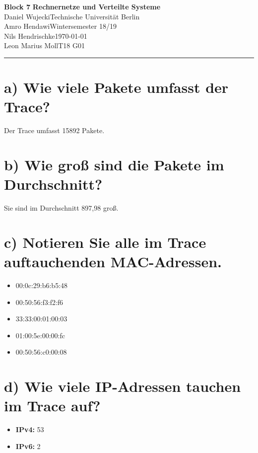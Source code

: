 \documentclass[a4paper, 11pt, fleqn, notitlepage, egregdoesnotlikesansseriftitles]{scrartcl}
\title{\aufgabe}
\subtitle{\modul}
\author{\name}
\date{\datum}
\newcommand{\aufgabe}{Block 7}
\newcommand{\modul}{Rechnernetze und Verteilte Systeme}
\newcommand{\sem}{Wintersemester 18/19}
\newcommand{\autorA}{Daniel Wujecki}
\newcommand{\autorB}{Amro Hendawi}
\newcommand{\autorC}{Nils Hendrischke}
\newcommand{\autorD}{Leon Marius Moll}
\newcommand{\uni}{Technische Universität Berlin}
\newcommand{\datum}{\today}
\begin{document}
\thispagestyle{scrplain}

\noindent\Large
\textbf{\aufgabe} \hfill \textbf{\modul} \\
\normalsize
\autorA \hfill \uni \\
\autorB \hfill \sem \\
\autorC \hfill \datum \\
\autorD \hfill T18 G01 \\
\rule{\textwidth}{0.1mm}



\section{a) Wie viele Pakete umfasst der Trace?}
Der Trace umfasst 15892 Pakete.

\section{b) Wie groß sind die Pakete im Durchschnitt?}
Sie sind im Durchschnitt 897,98 groß.

\section{c) Notieren Sie alle im Trace auftauchenden MAC-Adressen.}

\begin{itemize}
    \item 00:0c:29:b6:b5:48
    \item 00:50:56:f3:f2:f6
    \item 33:33:00:01:00:03
    \item 01:00:5e:00:00:fc
    \item 00:50:56:c0:00:08
\end{itemize}

\section{d) Wie viele IP-Adressen tauchen im Trace auf?}

\begin{itemize}
    \item \textbf{IPv4:} 53
    \item \textbf{IPv6:} 2
\end{itemize}
\end{document}
